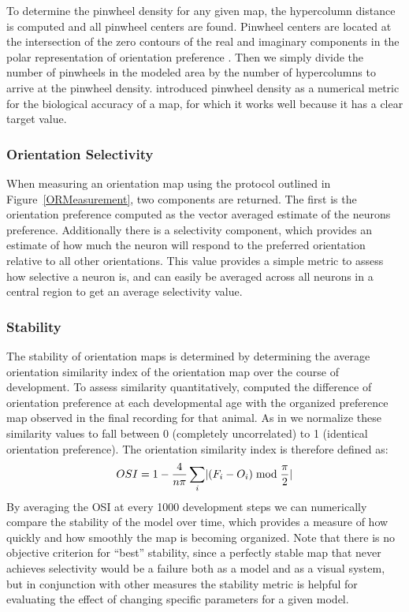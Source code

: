 To determine the pinwheel density for any given map, the hypercolumn
distance is computed and all pinwheel centers are found. Pinwheel
centers are located at the intersection of the zero contours of the
real and imaginary components in the polar representation of
orientation preference \citep{Lowel1998}. Then we simply divide the
number of pinwheels in the modeled area by the number of hypercolumns
to arrive at the pinwheel density.  \cite{Stevens2013} introduced
pinwheel density as a numerical metric for the biological accuracy of
a map, for which it works well because it has a clear target value.

\subsubsection{Orientation Selectivity}

When measuring an orientation map using the protocol outlined in
Figure~\ref{ORMeasurement}, two components are returned. The first is
the orientation preference computed as the vector averaged estimate of
the neurons preference. Additionally there is a selectivity component,
which provides an estimate of how much the neuron will respond to the
preferred orientation relative to all other orientations. This value
provides a simple metric to assess how selective a neuron is, and can
easily be averaged across all neurons in a central region to get an
average selectivity value.

\subsubsection{Stability}

The stability of orientation maps is determined by determining the
average orientation similarity index of the orientation map over the
course of development. To assess similarity quantitatively,
\cite{Chapman1996} computed the difference of orientation preference
at each developmental age with the organized preference map observed
in the final recording for that animal. As in \cite{Stevens2013} we
normalize these similarity values to fall between 0 (completely
uncorrelated) to 1 (identical orientation preference). The orientation
similarity index is therefore defined as:
\begin{equation}
  OSI = 1 - \frac{4}{n\pi} \sum_{i}\lvert(F_{i}-O_{i})\bmod\frac{\pi}{2}\rvert
\end{equation}
By averaging the OSI at every 1000 development steps we can
numerically compare the stability of the model over time, which
provides a measure of how quickly and how smoothly the map is becoming
organized. Note that there is no objective criterion for ``best''
stability, since a perfectly stable map that never achieves
selectivity would be a failure both as a model and as a visual system,
but in conjunction with other measures the stability metric is helpful
for evaluating the effect of changing specific parameters for a given
model.

